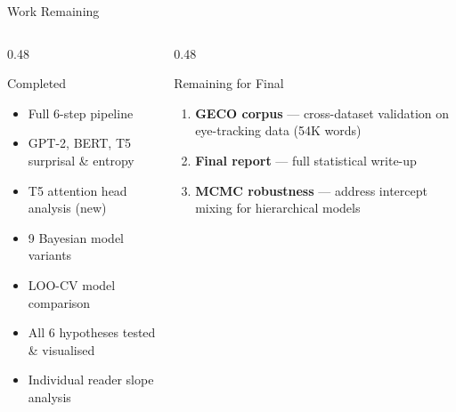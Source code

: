 \documentclass[aspectratio=169]{beamer}
\begin{document}
\begin{frame}{Work Remaining}

  \begin{columns}[T]
    \begin{column}{0.48\textwidth}
      \begin{exampleblock}{Completed \checkmark}
        \begin{itemize}
          \item Full 6-step pipeline
          \item GPT-2, BERT, T5 surprisal \& entropy
          \item T5 attention head analysis (new)
          \item 9 Bayesian model variants
          \item LOO-CV model comparison
          \item All 6 hypotheses tested \& visualised
          \item Individual reader slope analysis
        \end{itemize}
      \end{exampleblock}
    \end{column}
    \begin{column}{0.48\textwidth}
      \begin{alertblock}{Remaining for Final}
        \begin{enumerate}
          \item \textbf{GECO corpus} — cross-dataset validation on eye-tracking data (54K words)
          \item \textbf{Final report} — full statistical write-up
          \item \textbf{MCMC robustness} — address intercept mixing for hierarchical models
        \end{enumerate}
      \end{alertblock}
    \end{column}
  \end{columns}
\end{frame}
\end{document}
